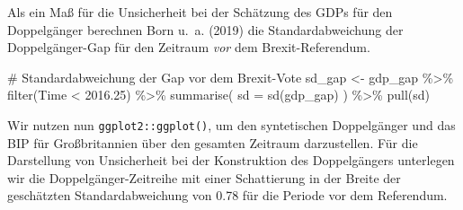 \documentclass[
  a4paper,
  DIV=11,
  oneside]{scrreprt}
\newenvironment{Shaded}{\begin{snugshade}}{\end{snugshade}}
\newcommand{\AttributeTok}[1]{\textcolor[rgb]{0.40,0.45,0.13}{#1}}
\newcommand{\CommentTok}[1]{\textcolor[rgb]{0.37,0.37,0.37}{#1}}
\newcommand{\FloatTok}[1]{\textcolor[rgb]{0.68,0.00,0.00}{#1}}
\newcommand{\FunctionTok}[1]{\textcolor[rgb]{0.28,0.35,0.67}{#1}}
\newcommand{\NormalTok}[1]{\textcolor[rgb]{0.00,0.23,0.31}{#1}}
\newcommand{\OtherTok}[1]{\textcolor[rgb]{0.00,0.23,0.31}{#1}}
\newcommand{\SpecialCharTok}[1]{\textcolor[rgb]{0.37,0.37,0.37}{#1}}
\begin{document}
Als ein Maß für die Unsicherheit bei der Schätzung des GDPs für den
Doppelgänger berechnen Born u.~a. (2019) die Standardabweichung der
Doppelgänger-Gap für den Zeitraum \emph{vor} dem Brexit-Referendum.

\begin{Shaded}
\begin{Highlighting}[]
\CommentTok{\# Standardabweichung der Gap vor dem Brexit{-}Vote}
\NormalTok{sd\_gap }\OtherTok{\textless{}{-}}\NormalTok{ gdp\_gap }\SpecialCharTok{\%\textgreater{}\%}
  \FunctionTok{filter}\NormalTok{(Time }\SpecialCharTok{\textless{}} \FloatTok{2016.25}\NormalTok{) }\SpecialCharTok{\%\textgreater{}\%} 
  \FunctionTok{summarise}\NormalTok{(}
    \AttributeTok{sd =} \FunctionTok{sd}\NormalTok{(gdp\_gap)}
\NormalTok{  ) }\SpecialCharTok{\%\textgreater{}\%} 
  \FunctionTok{pull}\NormalTok{(sd)}
\end{Highlighting}
\end{Shaded}

Wir nutzen nun \texttt{ggplot2::ggplot()}, um den syntetischen
Doppelgänger und das BIP für Großbritannien über den gesamten Zeitraum
darzustellen. Für die Darstellung von Unsicherheit bei der Konstruktion
des Doppelgängers unterlegen wir die Doppelgänger-Zeitreihe mit einer
Schattierung in der Breite der geschätzten Standardabweichung von 0.78
für die Periode vor dem Referendum.
\end{document}
